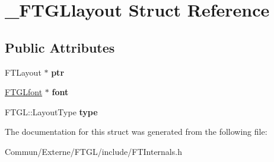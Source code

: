 \hypertarget{struct___f_t_g_llayout}{}\section{\+\_\+\+F\+T\+G\+Llayout Struct Reference}
\label{struct___f_t_g_llayout}
\subsection*{Public Attributes}
\begin{DoxyCompactItemize}
\item 
F\+T\+Layout $\ast$ {\bfseries ptr}\hypertarget{struct___f_t_g_llayout_aa005e0b4dbed84077bc849aee6cc072a}{}\label{struct___f_t_g_llayout_aa005e0b4dbed84077bc849aee6cc072a}

\item 
\hyperlink{struct___f_t_g_lfont}{F\+T\+G\+Lfont} $\ast$ {\bfseries font}\hypertarget{struct___f_t_g_llayout_a85b58d0b7343ae0b396417b3cf74ce06}{}\label{struct___f_t_g_llayout_a85b58d0b7343ae0b396417b3cf74ce06}

\item 
F\+T\+G\+L\+::\+Layout\+Type {\bfseries type}\hypertarget{struct___f_t_g_llayout_ace10a672a5f6d779ede1c6dfba6096f2}{}\label{struct___f_t_g_llayout_ace10a672a5f6d779ede1c6dfba6096f2}

\end{DoxyCompactItemize}


The documentation for this struct was generated from the following file\+:\begin{DoxyCompactItemize}
\item 
Commun/\+Externe/\+F\+T\+G\+L/include/F\+T\+Internals.\+h\end{DoxyCompactItemize}
